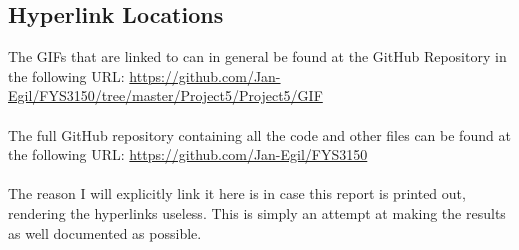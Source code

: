 \documentclass[reprint,english,notitlepage]{revtex4-1}  %
\begin{document}
\begin{appendix}
\section*{Hyperlink Locations}

The GIFs that are linked to can in general be found at the GitHub Repository in the following URL: \url{https://github.com/Jan-Egil/FYS3150/tree/master/Project5/Project5/GIF}
\\
\\
The full GitHub repository containing all the code and other files can be found at the following URL: \url{https://github.com/Jan-Egil/FYS3150}
\\
\\
The reason I will explicitly link it here is in case this report is printed out, rendering the hyperlinks useless. This is simply an attempt at making the results as well documented as possible.
\\
\\
\end{appendix}
\end{document}
